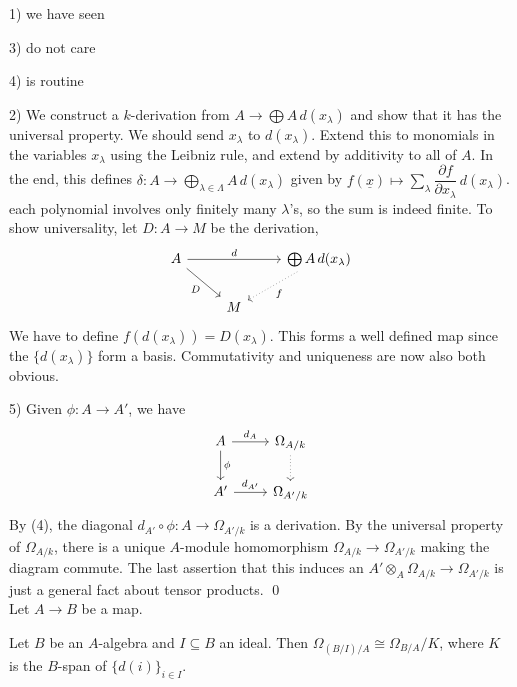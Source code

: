 \pf \hfill

1) we have seen

3) do not care

4) is routine

2) We construct a $k$-derivation from $A \to \bigoplus A \, d(x_\lambda)$ and show that it has the universal property. We should send $x_\lambda$ to $d(x_\lambda)$. Extend this to monomials in the variables $x_\lambda$ using the Leibniz rule, and extend by additivity to all of $A$. In the end, this defines $\delta: A \to \bigoplus_{\lambda \in \Lambda} A \, d(x_\lambda)$ given by $f(\underline{x}) \mapsto \sum_\lambda \dfrac{\partial f}{\partial x_\lambda} \, d(x_\lambda)$. each polynomial involves only finitely many $\lambda$'s, so the sum is indeed finite. To show universality, let $D: A \to M$ be the derivation,
	\[
	\begin{tikzcd}
	A \arrow[swap]{dr}{D} \arrow{rr}{d} &  & \bigoplus A \, d(x_\lambda) \arrow[dotted]{dl}{f} \\
	& M & 
	\end{tikzcd}
	\]
We have to define $f(d(x_\lambda))= D(x_\lambda)$. This forms a well defined map since the $\{d(x_\lambda)\}$ form a basis. Commutativity and uniqueness are now also both obvious. 

5) Given $\phi: A \to A'$, we have 
	\[
	\begin{tikzcd}
	A \arrow{r}{d_A} \arrow{d}{\phi} & \Omega_{A/k} \arrow[dotted]{d} \\
	A' \arrow{r}{d_{A'}} & \Omega_{A'/k}
	\end{tikzcd}
	\]
By (4), the diagonal $d_{A'} \circ \phi: A \to \Omega_{A'/k}$ is a derivation. By the universal property of $\Omega_{A/k}$, there is a unique $A$-module homomorphism $\Omega_{A/k} \to \Omega_{A'/k}$ making the diagram commute. The last assertion that this induces an $A' \otimes_A \Omega_{A/k} \to \Omega_{A'/k}$ is just a general fact about tensor products. \qed \\



Let $A \to B$ be a map.

\begin{prop} \label{prop:omegabspan}
Let $B$ be an $A$-algebra and $I \subseteq B$ an ideal. Then $\Omega_{(B/I)/A} \cong \Omega_{B/A}/K$, where $K$ is the $B$-span of $\{d(i)\}_{i \in I}$. 
\end{prop}

